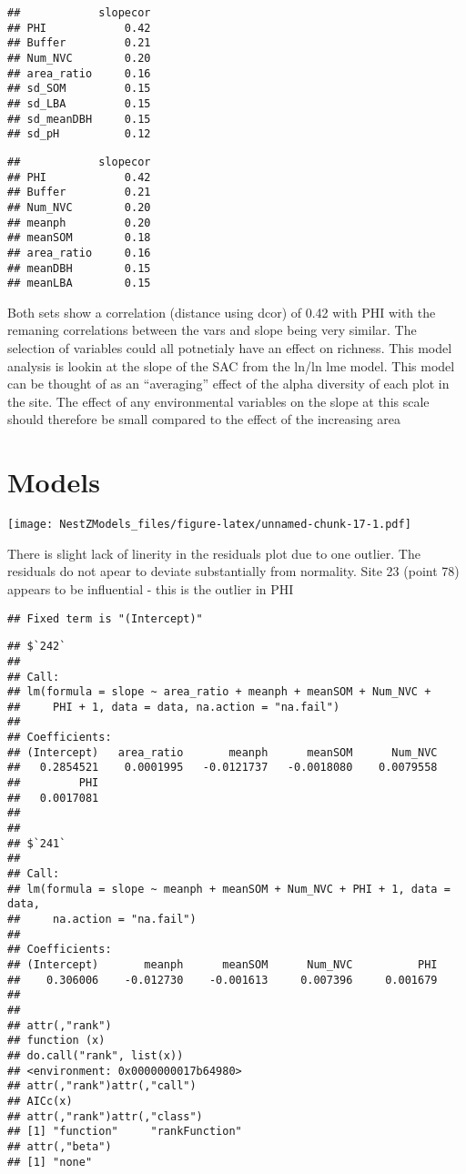 \documentclass[]{article}
\begin{document}
\begin{verbatim}
##            slopecor
## PHI            0.42
## Buffer         0.21
## Num_NVC        0.20
## area_ratio     0.16
## sd_SOM         0.15
## sd_LBA         0.15
## sd_meanDBH     0.15
## sd_pH          0.12
\end{verbatim}

\begin{verbatim}
##            slopecor
## PHI            0.42
## Buffer         0.21
## Num_NVC        0.20
## meanph         0.20
## meanSOM        0.18
## area_ratio     0.16
## meanDBH        0.15
## meanLBA        0.15
\end{verbatim}

Both sets show a correlation (distance using dcor) of 0.42 with PHI with
the remaning correlations between the vars and slope being very similar.
The selection of variables could all potnetialy have an effect on
richness. This model analysis is lookin at the slope of the SAC from the
ln/ln lme model. This model can be thought of as an ``averaging'' effect
of the alpha diversity of each plot in the site. The effect of any
environmental variables on the slope at this scale should therefore be
small compared to the effect of the increasing area

\section{Models}\label{models}

\texttt{[image: NestZModels\_files/figure-latex/unnamed-chunk-17-1.pdf]}

There is slight lack of linerity in the residuals plot due to one
outlier. The residuals do not apear to deviate substantially from
normality. Site 23 (point 78) appears to be influential - this is the
outlier in PHI

\begin{verbatim}
## Fixed term is "(Intercept)"
\end{verbatim}

\begin{verbatim}
## $`242`
## 
## Call:
## lm(formula = slope ~ area_ratio + meanph + meanSOM + Num_NVC + 
##     PHI + 1, data = data, na.action = "na.fail")
## 
## Coefficients:
## (Intercept)   area_ratio       meanph      meanSOM      Num_NVC  
##   0.2854521    0.0001995   -0.0121737   -0.0018080    0.0079558  
##         PHI  
##   0.0017081  
## 
## 
## $`241`
## 
## Call:
## lm(formula = slope ~ meanph + meanSOM + Num_NVC + PHI + 1, data = data, 
##     na.action = "na.fail")
## 
## Coefficients:
## (Intercept)       meanph      meanSOM      Num_NVC          PHI  
##    0.306006    -0.012730    -0.001613     0.007396     0.001679  
## 
## 
## attr(,"rank")
## function (x) 
## do.call("rank", list(x))
## <environment: 0x0000000017b64980>
## attr(,"rank")attr(,"call")
## AICc(x)
## attr(,"rank")attr(,"class")
## [1] "function"     "rankFunction"
## attr(,"beta")
## [1] "none"
\end{verbatim}
\end{document}
